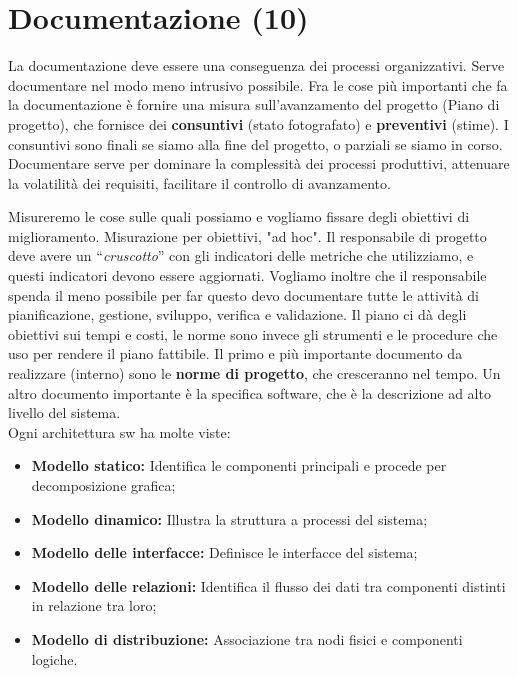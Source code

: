



\section{Documentazione (10)}

La documentazione deve essere una conseguenza dei processi organizzativi. Serve documentare nel modo meno intrusivo possibile. Fra le cose più importanti che fa la documentazione è fornire una misura sull'avanzamento del progetto (Piano di progetto), che fornisce dei \textbf{consuntivi} (stato fotografato) e \textbf{preventivi} (stime). I consuntivi sono finali se siamo alla fine del progetto, o parziali se siamo in corso. Documentare serve per dominare la complessità dei processi produttivi, attenuare la volatilità dei requisiti, facilitare il controllo di avanzamento.

Misureremo le cose sulle quali possiamo e vogliamo fissare degli obiettivi di miglioramento. Misurazione per obiettivi, "ad hoc". Il responsabile di progetto deve avere un ``\textit{cruscotto}'' con gli indicatori delle metriche che utilizziamo, e questi indicatori devono essere aggiornati. Vogliamo inoltre che il responsabile spenda il meno possibile per far questo devo documentare tutte le attività di pianificazione, gestione, sviluppo, verifica e validazione. Il piano ci dà degli obiettivi sui tempi e costi, le norme sono invece gli strumenti e le procedure che uso per rendere il piano fattibile. Il primo e più importante documento da realizzare (interno) sono le \textbf{norme di progetto}, che cresceranno nel tempo. Un altro documento importante è la specifica software, che è la descrizione ad alto livello del sistema.\\
Ogni architettura sw ha molte viste:

\begin{itemize}

	\item \textbf{Modello statico:} Identifica le componenti principali e procede per decomposizione grafica;
	\item \textbf{Modello dinamico:} Illustra la struttura a processi del sistema;
	\item \textbf{Modello delle interfacce:} Definisce le interfacce  del sistema;
	\item \textbf{Modello delle relazioni:} Identifica il flusso dei dati tra componenti distinti in relazione tra loro;
	\item \textbf{Modello di distribuzione:} Associazione tra nodi fisici e componenti logiche.

\end{itemize}

